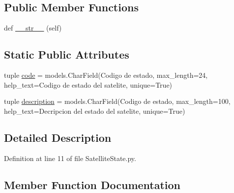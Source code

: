 \subsection*{Public Member Functions}
\begin{DoxyCompactItemize}
\item 
def \hyperlink{class_ground_segment_1_1models_1_1_satellite_state_1_1_satellite_state_a3ebf245bff3d614ecb8d468253b67a06}{\+\_\+\+\_\+str\+\_\+\+\_\+} (self)
\end{DoxyCompactItemize}
\subsection*{Static Public Attributes}
\begin{DoxyCompactItemize}
\item 
tuple \hyperlink{class_ground_segment_1_1models_1_1_satellite_state_1_1_satellite_state_af1bbab77a81b27614410584da4a1c51d}{code} = models.\+Char\+Field(\textquotesingle{}Codigo de estado\textquotesingle{}, max\+\_\+length=24, help\+\_\+text=\textquotesingle{}Codigo de estado del satelite\textquotesingle{}, unique=True)
\item 
tuple \hyperlink{class_ground_segment_1_1models_1_1_satellite_state_1_1_satellite_state_ac5038d32f285e6fd1da34bc7ed716495}{description} = models.\+Char\+Field(\textquotesingle{}Codigo de estado\textquotesingle{}, max\+\_\+length=100, help\+\_\+text=\textquotesingle{}Decripcion del estado del satelite\textquotesingle{}, unique=True)
\end{DoxyCompactItemize}


\subsection{Detailed Description}


Definition at line 11 of file Satellite\+State.\+py.



\subsection{Member Function Documentation}
\hypertarget{class_ground_segment_1_1models_1_1_satellite_state_1_1_satellite_state_a3ebf245bff3d614ecb8d468253b67a06}{}
